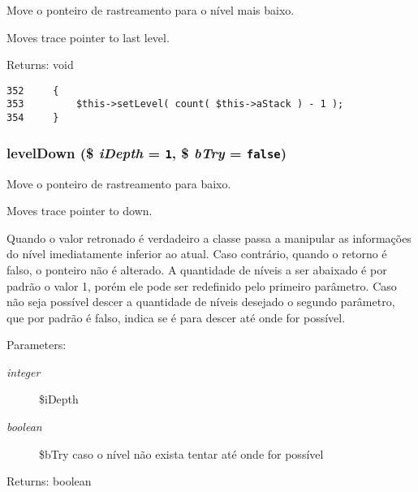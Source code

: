 Move o ponteiro de rastreamento para o nível mais baixo.

Moves trace pointer to last level.

\begin{Desc}
\item[Returns:]void \end{Desc}


\begin{Code}\begin{verbatim}352     {
353         $this->setLevel( count( $this->aStack ) - 1 );
354     }
\end{verbatim}
\end{Code}


\hypertarget{class_back_trace_abf1c1a9c1222e9ff2abb2dc29e7b610}{
\subsubsection[{levelDown}]{\setlength{\rightskip}{0pt plus 5cm}levelDown (\$ {\em iDepth} = {\tt 1}, \/  \$ {\em bTry} = {\tt false})}}
\label{class_back_trace_abf1c1a9c1222e9ff2abb2dc29e7b610}


Move o ponteiro de rastreamento para baixo.

Moves trace pointer to down.

Quando o valor retronado é verdadeiro a classe passa a manipular as informações do nível imediatamente inferior ao atual. Caso contrário, quando o retorno é falso, o ponteiro não é alterado. A quantidade de níveis a ser abaixado é por padrão o valor 1, porém ele pode ser redefinido pelo primeiro parâmetro. Caso não seja possível descer a quantidade de níveis desejado o segundo parâmetro, que por padrão é falso, indica se é para descer até onde for possível.

\begin{Desc}
\item[Parameters:]
\begin{description}
\item[{\em integer}]\$iDepth \item[{\em boolean}]\$bTry caso o nível não exista tentar até onde for possível \end{description}
\end{Desc}
\begin{Desc}
\item[Returns:]boolean \end{Desc}



